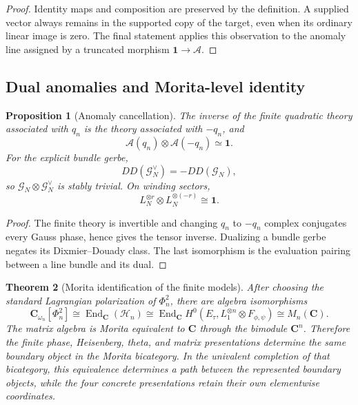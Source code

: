 \documentclass[11pt]{amsart}
\numberwithin{equation}{section}
\newtheorem{theorem}{Theorem}[section]
\newtheorem{proposition}[theorem]{Proposition}
\theoremstyle{definition}
\newcommand{\C}{\mathbf C}
\newcommand{\End}{\operatorname{End}}
\begin{document}
\begin{proof}
Identity maps and composition are preserved by the definition.  A supplied
vector always remains in the supported copy of the target, even when its
ordinary linear image is zero.  The final statement applies this observation
to the anomaly line assigned by a truncated morphism
$\mathbf1\to\mathcal A$.
\end{proof}

\subsection{Dual anomalies and Morita-level identity}

\begin{proposition}[Anomaly cancellation]
\label{prop:anomaly-cancellation}
The inverse of the finite quadratic theory associated with $q_n$ is the
theory associated with $-q_n$, and
\[
\mathcal A(q_n)\otimes\mathcal A(-q_n)\simeq\mathbf1.
\]
For the explicit bundle gerbe,
\[
DD(\mathcal G_N^\vee)=-DD(\mathcal G_N),
\]
so $\mathcal G_N\otimes\mathcal G_N^\vee$ is stably trivial.  On winding
sectors,
\[
L_N^{\otimes r}\otimes L_N^{\otimes(-r)}\cong\mathbf1.
\]
\end{proposition}

\begin{proof}
The finite theory is invertible and changing $q_n$ to $-q_n$ complex
conjugates every Gauss phase, hence gives the tensor inverse.  Dualizing a
bundle gerbe negates its Dixmier--Douady class.  The last isomorphism is the
evaluation pairing between a line bundle and its dual.
\end{proof}

\begin{theorem}[Morita identification of the finite models]
\label{thm:morita-univalent-finite}
After choosing the standard Lagrangian polarization of $\Phi_n^2$, there
are algebra isomorphisms
\[
\C_{\omega_n}[\Phi_n^2]
\cong
\End_\C(\mathscr H_n)
\cong
\End_\C H^0(E_\tau,L_1^{\otimes n}\otimes F_{\phi,\psi})
\cong M_n(\C).
\]
The matrix algebra is Morita equivalent to $\C$ through the bimodule
$\C^n$.  Therefore the finite phase, Heisenberg, theta, and matrix
presentations determine the same boundary object in the Morita bicategory.
In the univalent completion of that bicategory, this equivalence determines a path between the represented boundary objects, while the four concrete presentations retain their own elementwise coordinates.
\end{theorem}
\end{document}
